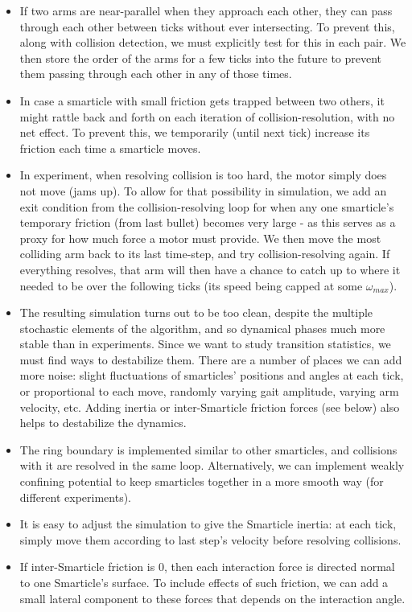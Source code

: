 \documentclass[reprint,prx]{revtex4-1}
\renewcommand{\=}[1]{\stackrel{#1}{=}} %
\renewcommand{\(}{\left (}
\renewcommand{\)}{\right  )}
\renewcommand{\[}{\left [}
\renewcommand{\]}{\right ]}
\newcommand{\<}{\left <}
\renewcommand{\>}{\right >}
\theoremstyle{definition}
\theoremstyle{remark}
\begin{document}
\begin{itemize}
	\item  If two arms are near-parallel when they approach each other, they can pass through each other between ticks without ever intersecting. To prevent this, along with collision detection, we must explicitly test for this in each pair. We then store the order of the arms for a few ticks into the future to prevent them passing through each other in any of those times.
	\item In case a smarticle with small friction gets trapped between two others, it might rattle back and forth on each iteration of collision-resolution, with no net effect. To prevent this, we temporarily (until next tick) increase its friction each time a smarticle moves.
	\item In experiment, when resolving collision is too hard, the motor simply does not move (jams up). To allow for that possibility in simulation, we add an exit condition from the collision-resolving loop for when any one smarticle's temporary friction (from last bullet) becomes very large - as this serves as a proxy for how much force a motor must provide. We then move the most colliding arm back to its last time-step, and try collision-resolving again. If everything resolves, that arm will then have a chance to catch up to where it needed to be over the following ticks (its speed being capped at some $ \omega_{max} $).
	\item The resulting simulation turns out to be too clean, despite the multiple stochastic elements of the algorithm, and so dynamical phases much more stable than in experiments. Since we want to study transition statistics, we must find ways to destabilize them. There are a number of places we can add more noise: slight fluctuations of smarticles' positions and angles at each tick, or proportional to each move, randomly varying gait amplitude, varying arm velocity, etc. Adding inertia or inter-Smarticle friction forces (see below) also helps to destabilize the dynamics.
	\item The ring boundary is implemented similar to other smarticles, and collisions with it are resolved in the same loop. Alternatively, we can implement weakly confining potential to keep smarticles together in a more smooth way (for different experiments).
	\item It is easy to adjust the simulation to give the Smarticle inertia: at each tick, simply move them according to last step's velocity before resolving collisions.
	\item  If inter-Smarticle friction is 0, then each interaction force is directed normal to one Smarticle's surface. To include effects of such friction, we can add a small lateral component to these forces that depends on the interaction angle.  
\end{itemize}
\end{document}
